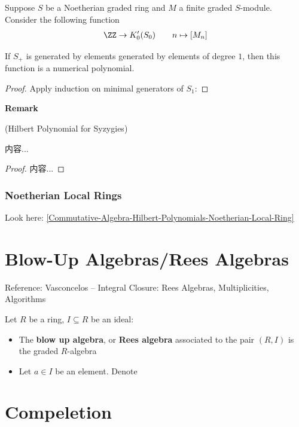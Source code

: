 \documentclass[Total.tex]{subfiles}
\begin{document}
				\begin{proposition}
					Suppose $S$ be a Noetherian graded ring and $M$ a finite graded $S$-module. Consider the following function
					\begin{gather*}
						\ZZ\rightarrow K_0'(S_0)\qquad n\mapsto [M_n]
					\end{gather*}
					
					If $S_+$ is generated by elements generated by elements of degree $1$, then this function is a numerical polynomial.
				\end{proposition}
				\begin{proof}
					Apply induction on minimal generators of $S_1$:
				\end{proof}
				
				\textbf{Remark}
				\begin{example}
					(Hilbert Polynomial for Syzygies)
				\end{example}
				
				\begin{lemma}
					内容...
				\end{lemma}
				\begin{proof}
					内容...
				\end{proof}
				\subsection{Noetherian Local Rings}
				
				Look here: \ref{Commutative-Algebra-Hilbert-Polynomials-Noetherian-Local-Ring}
	\chapter{Blow-Up Algebras/Rees Algebras}
		
		Reference: Vasconcelos – Integral Closure: Rees Algebras, Multiplicities, Algorithms
		
		\begin{Def}
			Let $R$ be a ring, $I\subseteq R$ be an ideal:
			
			\begin{itemize}
				\item The \textbf{blow up algebra}, or \textbf{Rees algebra} associated to the pair $(R,I)$ is the graded $R$-algebra
				\item Let $a\in I$ be an element. Denote
			\end{itemize}
		\end{Def}
		

	\chapter{Compeletion}
\end{document}
